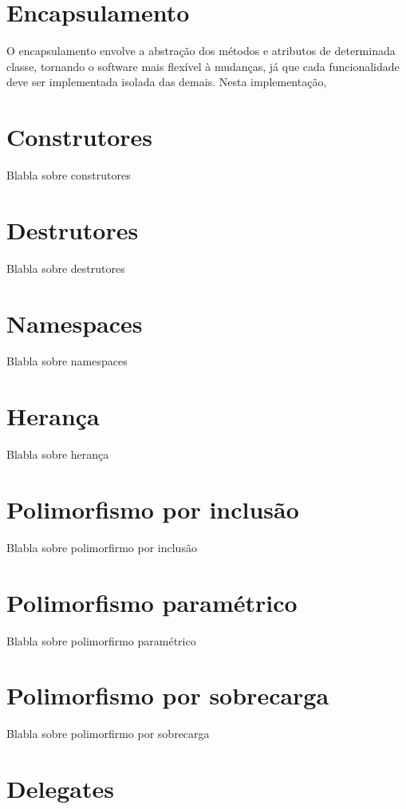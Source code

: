 \documentclass[rel_mlp]{iiufrgs}
\numberwithin{figure}{chapter}
\begin{document}
\section{Encapsulamento}

O encapsulamento envolve a abstração dos métodos e atributos de determinada classe, tornando o software mais flexível à mudanças, já que cada funcionalidade deve ser implementada isolada das demais. Nesta implementação, 

\section{Construtores}

Blabla sobre construtores

\section{Destrutores}

Blabla sobre destrutores

\section{Namespaces}

Blabla sobre namespaces

\section{Herança}

Blabla sobre herança

\section{Polimorfismo por inclusão}

Blabla sobre polimorfirmo por inclusão

\section{Polimorfismo paramétrico}

Blabla sobre polimorfirmo paramétrico

\section{Polimorfismo por sobrecarga}

Blabla sobre polimorfirmo por sobrecarga

\section{Delegates}
\end{document}
